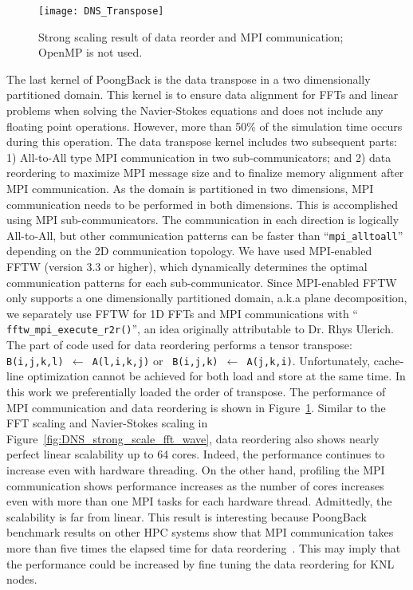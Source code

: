 \begin{figure}
 \begin{center}
   \texttt{[image: DNS\_Transpose]}
   \caption{Strong scaling result of data reorder and MPI communication; OpenMP is not used.}
   \label{fig:DNS_strong_scale_transpose}
 \end{center}
\end{figure}

The last kernel of PoongBack is the data transpose in a two dimensionally
partitioned domain. This kernel is to ensure data alignment for FFTs and
linear problems when solving the Navier-Stokes equations and does not include
any floating point operations. However, more than 50\% of the simulation
time occurs during this operation. The data transpose kernel includes two
subsequent parts: 1) All-to-All type MPI communication in two
sub-communicators; and 2) data reordering to maximize MPI message size
and to finalize memory alignment after MPI communication. As the
domain is partitioned in two dimensions, MPI communication needs to be
performed in both dimensions. This is accomplished using MPI sub-communicators.
The communication in each direction is logically All-to-All, but other communication
patterns can be faster than ``{\tt mpi\_alltoall}'' depending on the 2D
communication topology. We have used MPI-enabled FFTW (version 3.3 or
higher), which dynamically determines the optimal communication patterns for each
sub-communicator. Since MPI-enabled FFTW only supports a one dimensionally
partitioned domain, a.k.a plane decomposition, we separately use
FFTW for 1D FFTs and MPI communications with ``{\tt
fftw\_mpi\_execute\_r2r()}'', an idea originally attributable to Dr. Rhys
Ulerich.  The part of code used
for data reordering performs a tensor
transpose: {\tt B(i,j,k,l) $\leftarrow$ A(l,i,k,j)} or {\tt
B(i,j,k) $\leftarrow$ A(j,k,i)}. Unfortunately, cache-line
optimization cannot be achieved for both load and store at the same
time. In this work we preferentially loaded the order of transpose. 
The performance of MPI communication and data reordering is
shown in Figure~\ref{fig:DNS_strong_scale_transpose}. Similar to the FFT
scaling and Navier-Stokes scaling in Figure~\ref{fig:DNS_strong_scale_fft_wave},
data reordering also shows nearly
perfect linear scalability up to 64 cores. Indeed, the performance
continues to increase even with hardware threading.
On the other hand, profiling the MPI communication shows performance
increases as the number of cores increases even with more than one
MPI tasks for each hardware thread. Admittedly, the scalability is far from
linear. This result is interesting because PoongBack benchmark results
on other HPC systems show that MPI communication takes more than five
times the elapsed time for data reordering~\cite{Lee:2013kv}. This
may imply that the performance could be increased by fine tuning 
the data reordering for KNL nodes. 

